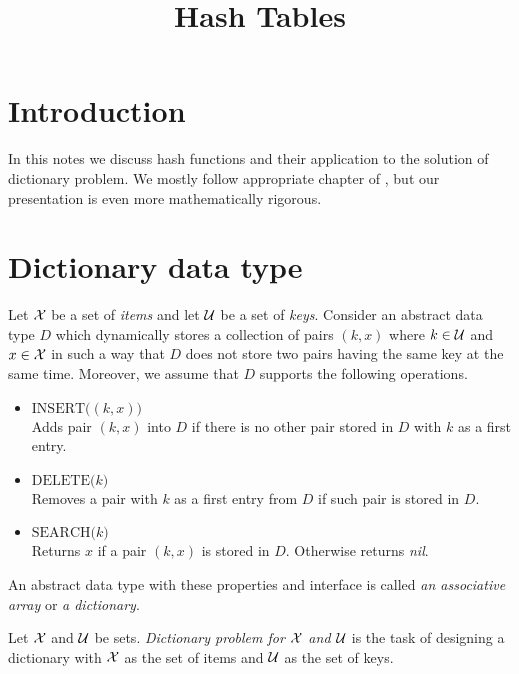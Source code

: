 


\title{Hash Tables}
\date{}
\maketitle

\section{Introduction}
\noindent
In this notes we discuss hash functions and their application to the solution of dictionary problem. We mostly follow appropriate chapter of \cite{CormenLeisersonRivestStein}, but our presentation is even more mathematically rigorous.

\section{Dictionary data type}

\begin{definition}
Let ${\mathcal X}$ be a set of \textit{items} and let ${\mathcal U}$ be a set of \textit{keys}. Consider an abstract data type $D$ which dynamically stores a collection of pairs $(k, x)$ where $k\in {\mathcal U}$ and $x\in {\mathcal X}$ in such a way that $D$ does not store two pairs having the same key at the same time. Moreover, we assume that $D$ supports the following operations.
\begin{itemize}
\item[] $\textrm{INSERT}\big((k,x)\big)$\\
Adds pair $(k,x)$ into $D$ if there is no other pair stored in $D$ with $k$ as a first entry.
\item[] $\textrm{DELETE}\big(k\big)$\\
Removes a pair with $k$ as a first entry from $D$ if such pair is stored in $D$.
\item[] $\textrm{SEARCH}\big(k\big)$\\
Returns $x$ if a pair $(k,x)$ is stored in $D$. Otherwise returns \textit{nil}. 
\end{itemize}
An abstract data type with these properties and interface is called \textit{an associative array} or \textit{a dictionary}.
\end{definition}

\begin{definition}
Let ${\mathcal X}$ and ${\mathcal U}$ be sets. \textit{Dictionary problem for ${\mathcal X}$ and ${\mathcal U}$} is the task of designing a dictionary with ${\mathcal X}$ as the set of items and ${\mathcal U}$ as the set of keys.
\end{definition}

